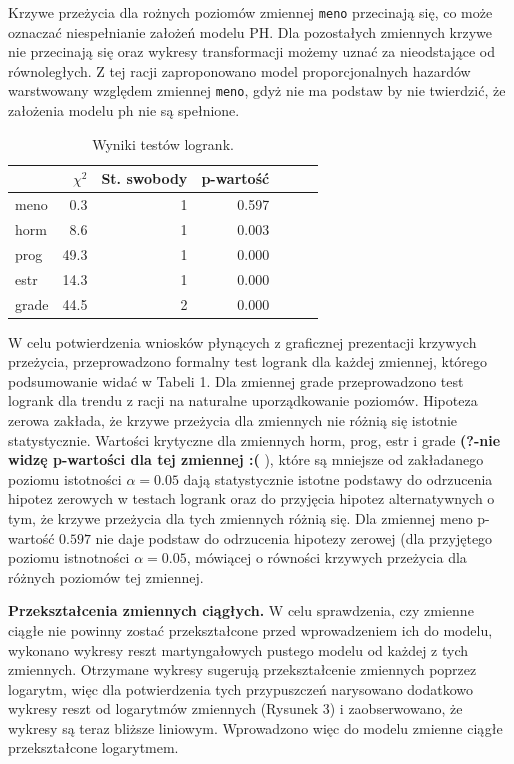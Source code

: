 \documentclass[]{article}
\begin{document}
Krzywe przeżycia dla rożnych poziomów zmiennej \texttt{meno} przecinają
się, co może oznaczać niespełnianie założeń modelu PH. Dla pozostałych
zmiennych krzywe nie przecinają się oraz wykresy transformacji możemy
uznać za nieodstające od równoległych. Z tej racji zaproponowano model
proporcjonalnych hazardów warstwowany względem zmiennej \texttt{meno},
gdyż nie ma podstaw by nie twierdzić, że założenia modelu ph nie są
spełnione.

\begin{table}
\vspace{-20pt}
\caption{ Wyniki testów logrank. }
\begin{tabular}{lrrrrrr}
\toprule%
\ &$\chi^2$&St. swobody&p-wartość\\ \toprule meno&0.3&1&0.597\\ horm&8.6&1&0.003\\ prog&49.3&1&0.000\\ estr&14.3&1&0.000\\ grade&44.5&2&0.000\\  \bottomrule
\end{tabular}
\vspace{-7.5pt}
\end{table}

W celu potwierdzenia wniosków płynących z graficznej prezentacji
krzywych przeżycia, przeprowadzono formalny test logrank dla każdej
zmiennej, którego podsumowanie widać w Tabeli 1. Dla zmiennej
\textsf{grade} przeprowadzono test logrank dla trendu z racji na
naturalne uporządkowanie poziomów. Hipoteza zerowa zakłada, że krzywe
przeżycia dla zmiennych nie różnią się istotnie statystycznie. Wartości
krytyczne dla zmiennych \textsf{horm}, \textsf{prog}, \textsf{estr} i
\textsf{grade} \textbf{ (?-nie widzę p-wartości dla tej zmiennej :( }),
które są mniejsze od zakładanego poziomu istotności $\alpha=0.05$ dają
statystycznie istotne podstawy do odrzucenia hipotez zerowych w testach
logrank oraz do przyjęcia hipotez alternatywnych o tym, że krzywe
przeżycia dla tych zmiennych różnią się. Dla zmiennej \textsf{meno}
p-wartość $0.597$ nie daje podstaw do odrzucenia hipotezy zerowej (dla
przyjętego poziomu istnotności $\alpha=0.05$, mówiącej o równości
krzywych przeżycia dla różnych poziomów tej zmiennej.

\newpage
\textbf{Przekształcenia zmiennych ciągłych.} \newline
W celu sprawdzenia, czy zmienne ciągłe nie powinny zostać przekształcone
przed wprowadzeniem ich do modelu, wykonano wykresy reszt martyngałowych
pustego modelu od każdej z tych zmiennych. Otrzymane wykresy sugerują
przekształcenie zmiennych poprzez logarytm, więc dla potwierdzenia tych
przypuszczeń narysowano dodatkowo wykresy reszt od logarytmów zmiennych
(Rysunek 3) i zaobserwowano, że wykresy są teraz bliższe liniowym.
Wprowadzono więc do modelu zmienne ciągłe przekształcone logarytmem.
\end{document}
